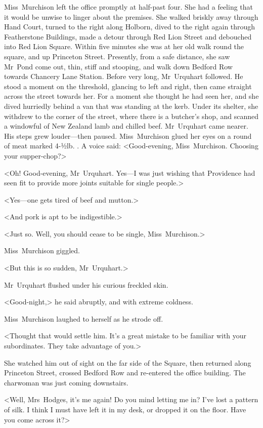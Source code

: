 Miss~Murchison left the office promptly at half-past four. She had a feeling that it would be unwise to linger about the premises. She walked briskly away through Hand Court, turned to the right along Holborn, dived to the right again through Featherstone Buildings, made a detour through Red Lion Street and debouched into Red Lion Square. Within five minutes she was at her old walk round the square, and up Princeton Street. Presently, from a safe distance, she saw Mr~Pond come out, thin, stiff and stooping, and walk down Bedford Row towards Chancery Lane Station. Before very long, Mr~Urquhart followed. He stood a moment on the threshold, glancing to left and right, then came straight across the street towards her. For a moment she thought he had seen her, and she dived hurriedly behind a van that was standing at the kerb. Under its shelter, she withdrew to the corner of the street, where there is a butcher's shop, and scanned a windowful of New Zealand lamb and chilled beef. Mr~Urquhart came nearer. His steps grew louder—then paused. Miss~Murchison glued her eyes on a round of meat marked 4-½lb. . A voice said: <Good-evening, Miss~Murchison. Choosing your supper-chop?>

<Oh! Good-evening, Mr~Urquhart. Yes—I was just wishing that Providence had seen fit to provide more joints suitable for single people.>

<Yes—one gets tired of beef and mutton.>

<And pork is apt to be indigestible.>

<Just so. Well, you should cease to be single, Miss~Murchison.>

Miss~Murchison giggled.

<But this is so sudden, Mr~Urquhart.>

Mr~Urquhart flushed under his curious freckled skin.

<Good-night,> he said abruptly, and with extreme coldness.

Miss~Murchison laughed to herself as he strode off.

<Thought that would settle him. It's a great mistake to be familiar with your subordinates. They take advantage of you.>

She watched him out of sight on the far side of the Square, then returned along Princeton Street, crossed Bedford Row and re-entered the office building. The charwoman was just coming downstairs.

<Well, Mrs~Hodges, it's me again! Do you mind letting me in? I've lost a pattern of silk. I think I must have left it in my desk, or dropped it on the floor. Have you come across it?>

